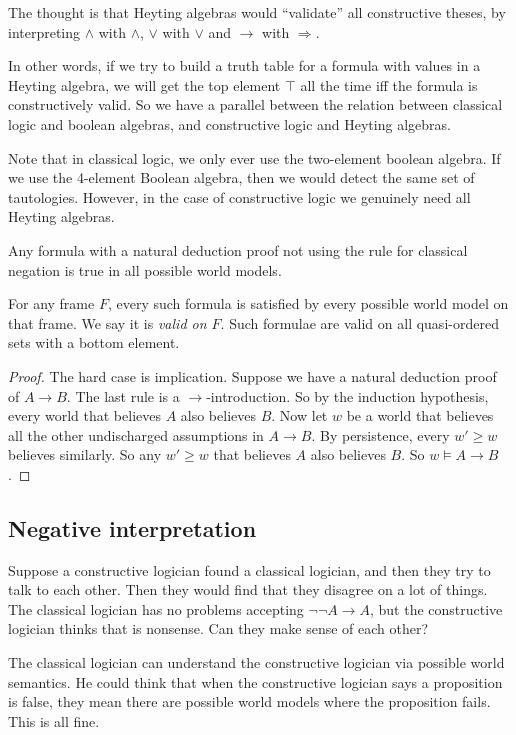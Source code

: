 \documentclass[a4paper]{article}
\begin{document}
The thought is that Heyting algebras would ``validate'' all constructive theses, by interpreting $\wedge$ with $\wedge$, $\vee$ with $\vee$ and $\rightarrow$ with $\Rightarrow$.

In other words, if we try to build a truth table for a formula with values in a Heyting algebra, we will get the top element $\top$ all the time iff the formula is constructively valid. So we have a parallel between the relation between classical logic and boolean algebras, and constructive logic and Heyting algebras.

Note that in classical logic, we only ever use the two-element boolean algebra. If we use the 4-element Boolean algebra, then we would detect the same set of tautologies. However, in the case of constructive logic we genuinely need all Heyting algebras.

\begin{lemma}
  Any formula with a natural deduction proof not using the rule for classical negation is true in all possible world models.
\end{lemma}
For any frame $F$, every such formula is satisfied by every possible world model on that frame. We say it is \emph{valid on $F$}. Such formulae are valid on all quasi-ordered sets with a bottom element.

\begin{proof}
  The hard case is implication. Suppose we have a natural deduction proof of $A \to B$. The last rule is a $\to$-introduction. So by the induction hypothesis, every world that believes $A$ also believes $B$. Now let $w$ be a world that believes all the other undischarged assumptions in $A \to B$. By persistence, every $w' \geq w$ believes similarly. So any $w' \geq w$ that believes $A$ also believes $B$. So $w \vDash A \to B$.
\end{proof}

\subsection{Negative interpretation}
Suppose a constructive logician found a classical logician, and then they try to talk to each other. Then they would find that they disagree on a lot of things. The classical logician has no problems accepting $\neg \neg A \to A$, but the constructive logician thinks that is nonsense. Can they make sense of each other?

The classical logician can understand the constructive logician via possible world semantics. He could think that when the constructive logician says a proposition is false, they mean there are possible world models where the proposition fails. This is all fine.
\end{document}
